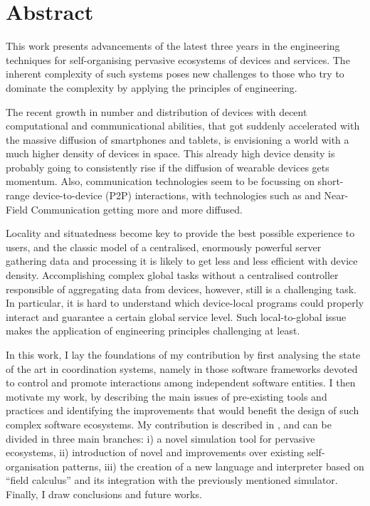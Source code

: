 \documentclass[12pt,a4paper,twoside,openright]{book}
\begin{document}
%
\frontmatter
\maketitle
\pagestyle{plain}
\tableofcontents

\chapter*{\centering Abstract}

This work presents advancements of the latest three years in the engineering techniques for self-organising pervasive ecosystems of devices and services.
%
The inherent complexity of such systems poses new challenges to those who try to dominate the complexity by applying the principles of engineering.

The recent growth in number and distribution of devices with decent computational and communicational abilities, that got suddenly accelerated with the massive diffusion of smartphones and tablets, is envisioning a world with a much higher density of devices in space.
%
This already high device density is probably going to consistently rise if the diffusion of wearable devices gets momentum.
%
Also, communication technologies seem to be focussing on short-range device-to-device (P2P) interactions, with technologies such as \btle{} and Near-Field Communication getting more and more diffused.

Locality and situatedness become key to provide the best possible experience to users, and the classic model of a centralised, enormously powerful server gathering data and processing it is likely to get less and less efficient with device density.
%
Accomplishing complex global tasks without a centralised controller responsible of aggregating data from devices, however, still is a challenging task.
%
In particular, it is hard to understand which device-local programs could properly interact and guarantee a certain global service level.
%
Such local-to-global issue makes the application of engineering principles challenging at least.

In this work, I lay the foundations of my contribution by first analysing the state of the art in coordination systems, namely in those software frameworks devoted to control and promote interactions among independent software entities.
%
I then motivate my work, by describing the main issues of pre-existing tools and practices and identifying the improvements that would benefit the design of such complex software ecosystems.
%
My contribution is described in , and can be divided in three main branches: i) a novel simulation tool for pervasive ecosystems, ii) introduction of novel and improvements over existing self-organisation patterns, iii) the creation of a new language and interpreter based on ``field calculus'' and its integration with the previously mentioned simulator.
%
Finally, I draw conclusions and future works.
\end{document}
